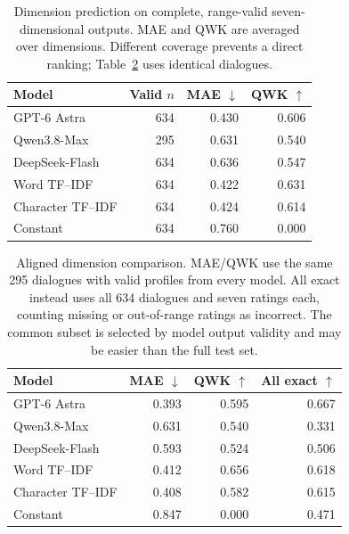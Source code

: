 \begin{table}[t]
\centering\small
\setlength{\tabcolsep}{3pt}
\begin{tabular}{@{}lrrr@{}}
\toprule
Model & Valid $n$ & MAE $\downarrow$ & QWK $\uparrow$\\
\midrule
GPT-6 Astra & 634 & 0.430 & 0.606\\
Qwen3.8-Max & 295 & 0.631 & 0.540\\
DeepSeek-Flash & 634 & 0.636 & 0.547\\
Word TF--IDF & 634 & 0.422 & 0.631\\
Character TF--IDF & 634 & 0.424 & 0.614\\
Constant & 634 & 0.760 & 0.000\\
\bottomrule
\end{tabular}
\caption{Dimension prediction on complete, range-valid seven-dimensional outputs. MAE and QWK are averaged over dimensions. Different coverage prevents a direct ranking; Table~\ref{tab:common_dimensions} uses identical dialogues.}
\label{tab:dimension_results}
\end{table}

\begin{table}[t]
\centering\small
\setlength{\tabcolsep}{3pt}
\begin{tabular}{@{}lrrr@{}}
\toprule
Model & MAE $\downarrow$ & QWK $\uparrow$ & All exact $\uparrow$\\
\midrule
GPT-6 Astra & 0.393 & 0.595 & 0.667\\
Qwen3.8-Max & 0.631 & 0.540 & 0.331\\
DeepSeek-Flash & 0.593 & 0.524 & 0.506\\
Word TF--IDF & 0.412 & 0.656 & 0.618\\
Character TF--IDF & 0.408 & 0.582 & 0.615\\
Constant & 0.847 & 0.000 & 0.471\\
\bottomrule
\end{tabular}
\caption{Aligned dimension comparison. MAE/QWK use the same 295 dialogues with valid profiles from every model. All exact instead uses all 634 dialogues and seven ratings each, counting missing or out-of-range ratings as incorrect. The common subset is selected by model output validity and may be easier than the full test set.}
\label{tab:common_dimensions}
\end{table}
